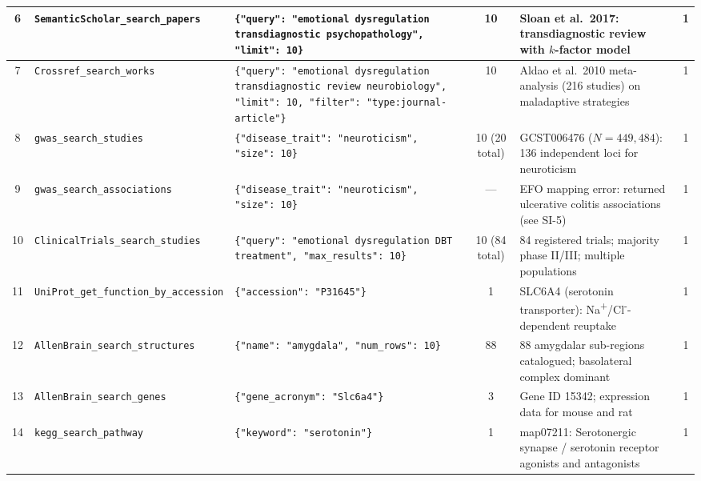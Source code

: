 \begin{longtable}{@{}c p{2.6cm} p{5.2cm} c p{3.8cm} c@{}}
6 &
\texttt{SemanticScholar\_\allowbreak search\_papers} &
\texttt{\{"query": "emotional dysregulation transdiagnostic psychopathology", "limit": 10\}} &
10 &
Sloan et al.\ 2017: transdiagnostic review with $k$-factor model &
1 \\
\midrule

7 &
\texttt{Crossref\_search\_\allowbreak works} &
\texttt{\{"query": "emotional dysregulation transdiagnostic review neurobiology", "limit": 10, "filter": "type:journal-article"\}} &
10 &
Aldao et al.\ 2010 meta-analysis (216 studies) on maladaptive strategies &
1 \\
\midrule

8 &
\texttt{gwas\_search\_\allowbreak studies} &
\texttt{\{"disease\_trait": "neuroticism", "size": 10\}} &
10 (20 total) &
GCST006476 ($N{=}449{,}484$): 136 independent loci for neuroticism &
1 \\
\midrule

9 &
\texttt{gwas\_search\_\allowbreak associations} &
\texttt{\{"disease\_trait": "neuroticism", "size": 10\}} &
--- &
EFO mapping error: returned ulcerative colitis associations (see SI-5) &
1 \\
\midrule

10 &
\texttt{ClinicalTrials\_\allowbreak search\_studies} &
\texttt{\{"query": "emotional dysregulation DBT treatment", "max\_results": 10\}} &
10 (84 total) &
84 registered trials; majority phase II/III; multiple populations &
1 \\
\midrule

11 &
\texttt{UniProt\_get\_\allowbreak function\_by\_\allowbreak accession} &
\texttt{\{"accession": "P31645"\}} &
1 &
SLC6A4 (serotonin transporter): Na\textsuperscript{+}/Cl\textsuperscript{-}-dependent reuptake &
1 \\
\midrule

12 &
\texttt{AllenBrain\_search\_\allowbreak structures} &
\texttt{\{"name": "amygdala", "num\_rows": 10\}} &
88 &
88 amygdalar sub-regions catalogued; basolateral complex dominant &
1 \\
\midrule

13 &
\texttt{AllenBrain\_search\_\allowbreak genes} &
\texttt{\{"gene\_acronym": "Slc6a4"\}} &
3 &
Gene ID 15342; expression data for mouse and rat &
1 \\
\midrule

14 &
\texttt{kegg\_search\_\allowbreak pathway} &
\texttt{\{"keyword": "serotonin"\}} &
1 &
map07211: Serotonergic synapse / serotonin receptor agonists and antagonists &
1 \\
\midrule


\end{longtable}
